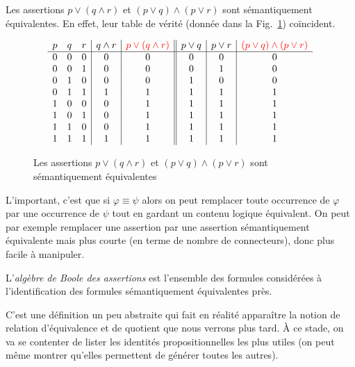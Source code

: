 \documentclass[french,course,oneside,theoremnosection]{lecture}
\begin{document}
\begin{example}
Les assertions $p\vee (q \wedge r)$ et $(p \vee q) \wedge (p \vee r)$ sont sémantiquement équivalentes. En effet, leur table de vérité (donnée dans la Fig.~\ref{fig:equiv}) coïncident.
\begin{figure}
\[
\begin{array}{ccc|c|c||c|c|ccc}
  p & q & r & q \wedge r & \color{red}p \vee (q \wedge r)\color{black} & p \vee q & p \vee r & \color{red}(p \vee q) \wedge (p \vee r)\color{black} \\
  \hline
  0 & 0 & 0 & 0 & 0 & 0 & 0 & 0 \\
  0 & 0 & 1 & 0 & 0 & 0 & 1 & 0 \\
  0 & 1 & 0 & 0 & 0 & 1 & 0 & 0 \\
  0 & 1 & 1 & 1 & 1 & 1 & 1 & 1 \\
  1 & 0 & 0 & 0 & 1 & 1 & 1 & 1 \\
  1 & 0 & 1 & 0 & 1 & 1 & 1 & 1 \\
  1 & 1 & 0 & 0 & 1 & 1 & 1 & 1 \\
  1 & 1 & 1 & 1 & 1 & 1 & 1 & 1 \\
\end{array}
\]
\caption{Les assertions $p \vee (q \wedge r)$ et $(p \vee q) \wedge (p \vee r)$ sont sémantiquement équivalentes}\label{fig:equiv}
\end{figure}
\end{example}

L'important, c'est que si $\varphi \equiv \psi$ alors on peut remplacer toute occurrence de $\varphi$ par une occurrence de $\psi$ tout en gardant un contenu logique équivalent. On peut par exemple remplacer une assertion par une assertion sémantiquement équivalente mais plus courte (en terme de nombre de connecteurs), donc plus facile à manipuler.


\begin{definition}
L'\emph{algèbre de Boole des assertions} est l'ensemble des formules considérées à l'identification des formules sémantiquement équivalentes près.
\end{definition}

C'est une définition un peu abstraite qui fait en réalité apparaître la notion de relation d'équivalence et de quotient que nous verrons plus tard. À ce stade, on va se contenter de lister les identités propositionnelles les plus utiles (on peut même montrer qu'elles permettent de générer toutes les autres).
\end{document}
